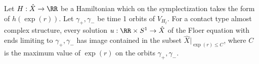 
 
   \label{prp:liouvilleIsGeometricallyBounded}
    Let $H: \hat X\to \RR$ be a Hamiltonian which on the symplectization takes the form of $h(\exp(r))$. 
    Let $\gamma_+, \gamma_-$ be time 1 orbits of $V_{H_{t}}$. For a contact type almost complex structure, every solution $u: \RR\times S^1\to \hat X$ of the Floer equation with ends limiting to $\gamma_+, \gamma_-$ has image contained in the subset $\hat X|_{\exp(r)\leq C}$, where $C$ is the maximum value of $\exp(r)$ on the orbits $\gamma_+, \gamma_-$.
 